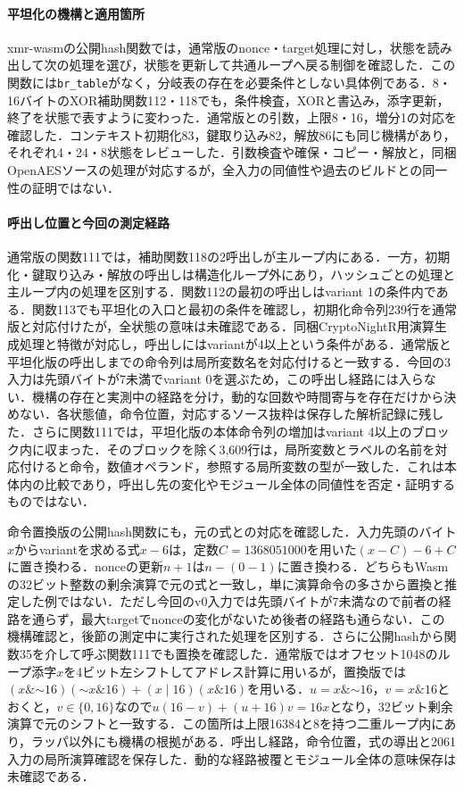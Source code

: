 \documentclass[submit,techrep]{ipsj}
\begin{document}
\paragraph{平坦化の機構と適用箇所}xmr-wasmの公開hash関数では，通常版のnonce・target処理に対し，状態を読み出して次の処理を選び，状態を更新して共通ループへ戻る制御を確認した．この関数には\texttt{br\_table}がなく，分岐表の存在を必要条件としない具体例である．8・16バイトのXOR補助関数112・118でも，条件検査，XORと書込み，添字更新，終了を状態で表すように変わった．通常版との引数，上限8・16，増分1の対応を確認した．コンテキスト初期化83，鍵取り込み82，解放86にも同じ機構があり，それぞれ4・24・8状態をレビューした．引数検査や確保・コピー・解放と，同梱OpenAESソースの処理が対応するが，全入力の同値性や過去のビルドとの同一性の証明ではない．

\paragraph{呼出し位置と今回の測定経路}通常版の関数111では，補助関数118の2呼出しが主ループ内にある．一方，初期化・鍵取り込み・解放の呼出しは構造化ループ外にあり，ハッシュごとの処理と主ループ内の処理を区別する．関数112の最初の呼出しはvariant 1の条件内である．関数113でも平坦化の入口と最初の条件を確認し，初期化命令列239行を通常版と対応付けたが，全状態の意味は未確認である．同梱CryptoNightR用演算生成処理と特徴が対応し，呼出しにはvariantが4以上という条件がある．通常版と平坦化版の呼出しまでの命令列は局所変数名を対応付けると一致する．今回の3入力は先頭バイトが7未満でvariant 0を選ぶため，この呼出し経路には入らない．機構の存在と実測中の経路を分け，動的な回数や時間寄与を存在だけから決めない．各状態値，命令位置，対応するソース抜粋は保存した解析記録に残した．さらに関数111では，平坦化版の本体命令列の増加はvariant 4以上のブロック内に収まった．そのブロックを除く3,609行は，局所変数とラベルの名前を対応付けると命令，数値オペランド，参照する局所変数の型が一致した．これは本体内の比較であり，呼出し先の変化やモジュール全体の同値性を否定・証明するものではない．

命令置換版の公開hash関数にも，元の式との対応を確認した．入力先頭のバイト$x$からvariantを求める式$x-6$は，定数$C=1368051000$を用いた$(x-C)-6+C$に置き換わる．nonceの更新$n+1$は$n-(0-1)$に置き換わる．どちらもWasmの32ビット整数の剰余演算で元の式と一致し，単に演算命令の多さから置換と推定した例ではない．ただし今回のv0入力では先頭バイトが7未満なので前者の経路を通らず，最大targetでnonceの変化がないため後者の経路も通らない．この機構確認と，後節の測定中に実行された処理を区別する．さらに公開hashから関数35を介して呼ぶ関数111でも置換を確認した．通常版ではオフセット1048のループ添字$x$を4ビット左シフトしてアドレス計算に用いるが，置換版では$(x\mathbin{\&}\mathord{\sim}16)(\mathord{\sim}x\mathbin{\&}16)+(x\mathbin{|}16)(x\mathbin{\&}16)$を用いる．$u=x\mathbin{\&}\mathord{\sim}16$，$v=x\mathbin{\&}16$とおくと，$v\in\{0,16\}$なので$u(16-v)+(u+16)v=16x$となり，32ビット剰余演算で元のシフトと一致する．この箇所は上限16384と8を持つ二重ループ内にあり，ラッパ以外にも機構の根拠がある．呼出し経路，命令位置，式の導出と2061入力の局所演算確認を保存した．動的な経路被覆とモジュール全体の意味保存は未確認である．
\end{document}
